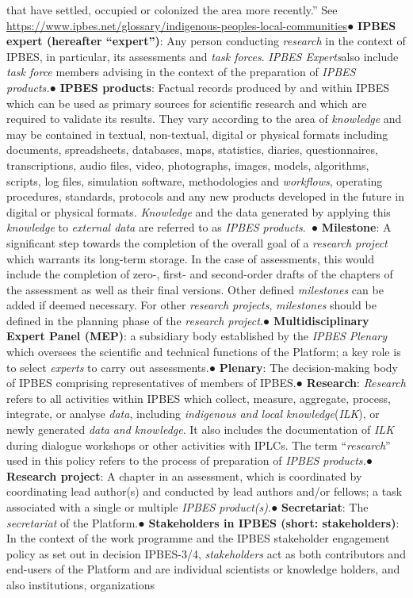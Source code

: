 \documentclass{article}
\begin{document}
that have settled, occupied or colonized the area more recently.” See \href{https://www.ipbes.net/glossary/indigenous-peoples-local-communities}{https://www.ipbes.net/glossary/indigenous-peoples-local-communities}● \textbf{IPBES expert (hereafter “expert”)}: Any person conducting \textit{research} in the context of IPBES, in particular, its assessments and \textit{task forces}. \textit{IPBES Experts}also include \textit{task force} members advising in the context of the preparation of \textit{IPBES products.}● \textbf{IPBES products}: Factual records produced by and within IPBES which can be used as primary sources for scientific research and which are required to validate its results. They vary according to the area of \textit{knowledge }and may be contained in textual, non-textual, digital or physical formats including documents, spreadsheets, databases, maps, statistics, diaries, questionnaires, transcriptions, audio files, video, photographs, images, models, algorithms, scripts, log files, simulation software, methodologies and \textit{workflows}, operating procedures, standards, protocols and any new products developed in the future in digital or physical formats. \textit{Knowledge }and the data generated by applying this \textit{knowledge} to \textit{external data} are referred to as\textit{ IPBES products}. ● \textbf{Milestone}: A significant step towards the completion of the overall goal of a \textit{research project} which warrants its long-term storage. In the case of assessments, this would include the completion of zero-, first- and second-order drafts of the chapters of the assessment as well as their final versions. Other defined \textit{milestones }can be added if deemed necessary. For other \textit{research projects}, \textit{milestones }should be defined in the planning phase of the \textit{research project}.● \textbf{Multidisciplinary Expert Panel (MEP)}: a subsidiary body established by the \textit{IPBES Plenary }which oversees the scientific and technical functions of the Platform; a key role is to select \textit{experts} to carry out assessments.● \textbf{Plenary}: The decision-making body of IPBES comprising representatives of members of IPBES.● \textbf{Research}: \textit{Research} refers to all activities within IPBES which collect, measure, aggregate, process, integrate, or analyse \textit{data}, including \textit{indigenous and local knowledge}(\textit{ILK}), or newly generated \textit{data} \textit{and knowledge}. It also includes the documentation of \textit{ILK} during dialogue workshops or other activities with IPLCs. The term “\textit{research}” used in this policy refers to the process of preparation of \textit{IPBES products.}● \textbf{Research project}: A chapter in an assessment, which is coordinated by coordinating lead author(s) and conducted by lead authors and/or fellows; a task associated with a single or multiple \textit{IPBES product(s)}.● \textbf{Secretariat}: The \textit{secretariat }of the Platform.● \textbf{Stakeholders in IPBES (short: stakeholders)}: In the context of the work programme and the IPBES stakeholder engagement policy as set out in decision IPBES-3/4, \textit{stakeholders} act as both contributors and end-users of the Platform and are individual scientists or knowledge holders, and also institutions, organizations 
\end{document}
